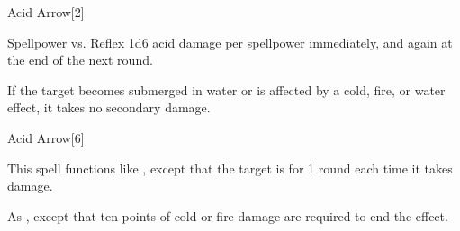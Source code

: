 \begin{spellsection}{Acid Arrow}[2]
    \begin{spellheader}
    \end{spellheader}
    \begin{spellcontent}
        \begin{spelltargetinginfo}
        \end{spelltargetinginfo}
        \begin{spelleffects}
            \begin{spellattack}{Spellpower vs. Reflex}
                \spellsuccess 1d6 acid damage per spellpower immediately, and again at the end of the next round.
            \end{spellattack}
        \end{spelleffects}
    \end{spellcontent}
    \begin{spellfooter}
        \spellnotes If the target becomes submerged in water or is affected by a cold, fire, or water effect, it takes no secondary damage.

        \physicalspellnotes
        \miscastrandom
    \end{spellfooter}
\end{spellsection}

\begin{spellsection}[Greater]{Acid Arrow}[6]
    \begin{spellheader}
    \end{spellheader}
    \begin{spellcontent}
        \begin{spelleffects}
            \spellspecial This spell functions like , except that the target is \staggered for 1 round each time it takes damage.
        \end{spelleffects}
    \end{spellcontent}
    \begin{spellfooter}
        \spellnotes As , except that ten points of cold or fire damage are required to end the effect.
        \miscastrandom
    \end{spellfooter}
\end{spellsection}

